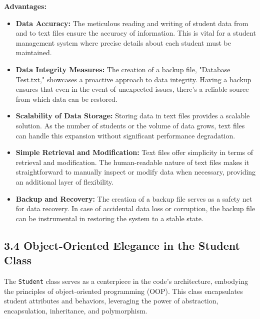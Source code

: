 \documentclass{article}
\begin{document}
\textbf{Advantages:}
\begin{itemize}
    \item \textbf{Data Accuracy:} The meticulous reading and writing of student data from and to text files ensure the accuracy of information. 
    This is vital for a student management system where precise details about each student must be maintained.
    \item \textbf{Data Integrity Measures:} The creation of a backup file, "Database\\Test.txt," showcases a proactive approach to data integrity. 
    Having a backup ensures that even in the event of unexpected issues, there's a reliable source from which data can be restored.
    \item \textbf{Scalability of Data Storage:} Storing data in text files provides a scalable solution. 
    As the number of students or the volume of data grows, text files can handle this expansion without significant performance degradation.
    \item \textbf{Simple Retrieval and Modification:} Text files offer simplicity in terms of retrieval and modification. 
    The human-readable nature of text files makes it straightforward to manually inspect or modify data when necessary, providing an additional layer of flexibility.
    \item \textbf{Backup and Recovery:} The creation of a backup file serves as a safety net for data recovery. 
    In case of accidental data loss or corruption, the backup file can be instrumental in restoring the system to a stable state.
\end{itemize}

\subsection*{\textbf{3.4 Object-Oriented Elegance in the Student Class}}

The \texttt{Student} class serves as a centerpiece in the code's architecture, embodying the principles of object-oriented programming (OOP). 
This class encapsulates student attributes and behaviors, leveraging the power of abstraction, encapsulation, inheritance, and polymorphism.
\end{document}
